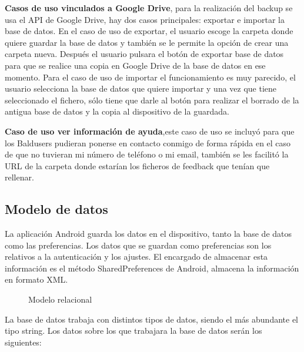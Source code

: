 \textbf{Casos de uso vinculados a Google Drive}, para la realización del backup se usa el API de Google Drive, hay dos casos principales: exportar e importar la base de datos.
En el caso de uso de exportar, el usuario escoge la carpeta donde quiere guardar la base de datos y también se le permite la opción de crear una carpeta nueva.
Después el usuario pulsara el botón de exportar base de datos para que se realice una copia en Google Drive de la base de datos en ese momento.
Para el caso de uso de importar el funcionamiento es muy parecido, el usuario selecciona la base de datos que quiere importar y una vez que tiene seleccionado el fichero, sólo tiene que darle al botón para realizar el borrado de la antigua base de datos y la copia al dispositivo de la guardada.

\textbf{Caso de uso ver información de ayuda},este caso de uso se incluyó para que los Baldusers pudieran ponerse en contacto conmigo de forma rápida en el caso de que no tuvieran mi número de teléfono o mi email, también se les facilitó la URL de la carpeta donde estarían los ficheros de feedback que tenían que rellenar.

\subsection{Modelo de datos}
\label{subsecc:modelo de datos}

La aplicación Android guarda los datos en el dispositivo, tanto la base de datos como las preferencias.
Los datos que se guardan como preferencias son los relativos a la autenticación y los ajustes. El encargado de almacenar esta información es el método SharedPreferences de Android, almacena la información en formato XML.


\begin{figure}
  \begin{center} 
    \caption{Modelo relacional} 
    \label{fig:ModeloRelacional} 
  \end{center} 
\end{figure}
La base de datos trabaja con distintos tipos de datos, siendo el más abundante el tipo string.
Los datos sobre los que trabajara la base de datos serán los siguientes:

